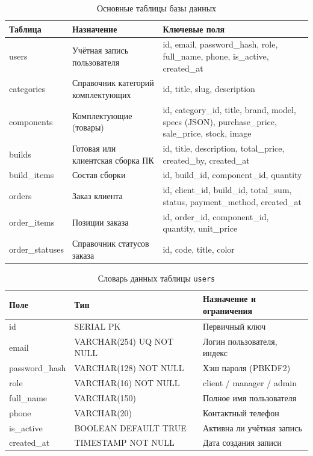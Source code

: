 \begin{table}[ht!]
\caption{Основные таблицы базы данных}
\label{tab:db}
\small
\begin{tabularx}{\textwidth}{|>{\RaggedRight\arraybackslash}p{}|>{\RaggedRight\arraybackslash}p{}|>{\RaggedRight\arraybackslash}X|}
\hline
\textbf{Таблица} & \textbf{Назначение} & \textbf{Ключевые поля} \\ \hline
users & Учётная запись пользователя & id, email, password\_hash, role, full\_name, phone, is\_active, created\_at \\ \hline
categories & Справочник категорий комплектующих & id, title, slug, description \\ \hline
components & Комплектующие (товары) & id, category\_id, title, brand, model, specs (JSON), purchase\_price, sale\_price, stock, image \\ \hline
builds & Готовая или клиентская сборка ПК & id, title, description, total\_price, created\_by, created\_at \\ \hline
build\_items & Состав сборки & id, build\_id, component\_id, quantity \\ \hline
orders & Заказ клиента & id, client\_id, build\_id, total\_sum, status, payment\_method, created\_at \\ \hline
order\_items & Позиции заказа & id, order\_id, component\_id, quantity, unit\_price \\ \hline
order\_statuses & Справочник статусов заказа & id, code, title, color \\ \hline
\end{tabularx}
\end{table}

\begin{table}[ht!]
\caption{Словарь данных таблицы \texttt{users}}
\label{tab:dd-users}
\small
\begin{tabularx}{\textwidth}{|>{\RaggedRight\arraybackslash}p{}|>{\RaggedRight\arraybackslash}p{}|>{\RaggedRight\arraybackslash}X|}
\hline
\textbf{Поле} & \textbf{Тип} & \textbf{Назначение и ограничения} \\ \hline
id & SERIAL PK & Первичный ключ \\ \hline
email & VARCHAR(254) UQ NOT NULL & Логин пользователя, индекс \\ \hline
password\_hash & VARCHAR(128) NOT NULL & Хэш пароля (PBKDF2) \\ \hline
role & VARCHAR(16) NOT NULL & client / manager / admin \\ \hline
full\_name & VARCHAR(150) & Полное имя пользователя \\ \hline
phone & VARCHAR(20) & Контактный телефон \\ \hline
is\_active & BOOLEAN DEFAULT TRUE & Активна ли учётная запись \\ \hline
created\_at & TIMESTAMP NOT NULL & Дата создания записи \\ \hline
\end{tabularx}
\end{table}

